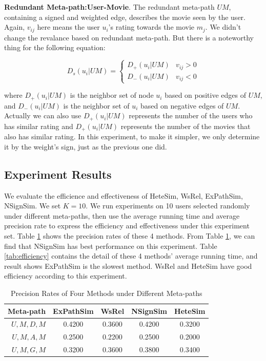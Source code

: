 \documentclass{acm_proc_article-csis8101}
\begin{document}
\textbf{Redundant Meta-path:User-Movie}. The redundant meta-path $UM$, containing a signed and weighted edge, describes the movie seen by the user. Again, $v_{ij}$ here means the user $u_{i}$'s rating towards the movie $m_{j}$. We didn't change the revalance based on redundant meta-path. But there is a noteworthy thing for the following equation:

\begin{equation}
D_{s}(u_{i}|UM)=
\begin{cases}
D_{+}(u_{i}|UM)& v_{ij} > 0 \\
D_{-}(u_{i}|UM)& v_{ij} < 0
\end{cases}
\end{equation}

where $D_{+}(u_{i}|UM)$ is the neighbor set of node $u_{i}$ based on positive edges of $UM$, and $D_{-}(u_{i}|UM)$ is the neighbor set of $u_{i}$ based on negative edges of $UM$. Actually we can also use $D_{+}(u_{i}|UM)$ represents the number of the users who has similar rating and $D_{+}(u_{i}|UM)$ represents the number of the movies that also has similar rating. In this experiment, to make it simpler, we only determine it by the weight's sign, just as the previous one did.

\subsection{Experiment Results}

We evaluate the efficience and effectiveness of HeteSim, WsRel, ExPathSim, NSignSim. We set $K = 10$. We run experiments on 10 users selected randomly under different meta-paths, then use the average running time and average precision rate to express the efficiency and effectiveness under this experiment set. Table \ref{tab:precision} shows the precision rates of these 4 methods. From Table \ref{tab:precision}, we can find that NSignSim has best performance on this experiment. Table \ref{tab:efficiency} contains the detail of these 4 methods' average running time, and result shows ExPathSim is the slowest method. WsRel and HeteSim have good efficiency according to this experiment.

\begin{table}
\centering
\caption{Precision Rates of Four Methods under Different Meta-paths} 
\label{tab:precision}
\begin{tabular}{|r|c|c|c|c|} \hline
Meta-path & ExPathSim & WsRel & NSignSim & HeteSim \\ \hline
$U,M,D,M$ & 0.4200 & 0.3600 & 0.4200 & 0.3200 \\ \hline
$U,M,A,M$ & 0.2500 & 0.2200 & 0.2500 & 0.2000 \\ \hline
$U,M,G,M$ & 0.3200 & 0.3600 & 0.3800 & 0.3400 \\ \hline
\end{tabular}
\end{table}
\end{document}

